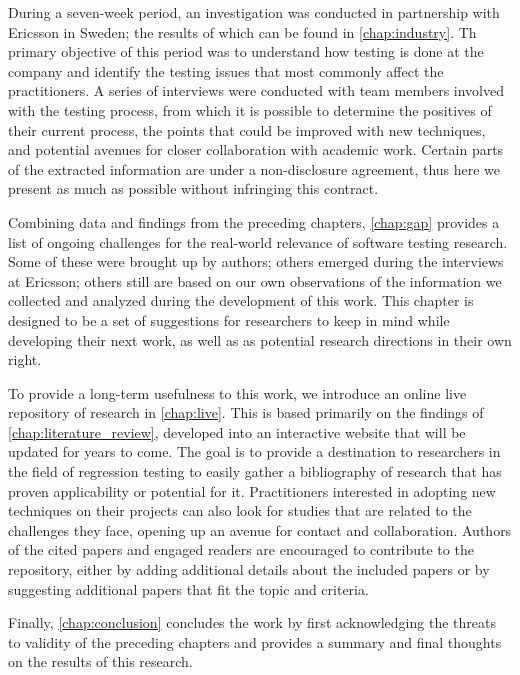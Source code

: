 During a seven-week period, an investigation was conducted in partnership with Ericsson in Sweden; the results of which can be found in \autoref{chap:industry}.
Th primary objective of this period was to understand how testing is done at the company and identify the testing issues that most commonly affect the practitioners.
A series of interviews were conducted with team members involved with the testing process, from which it is possible to determine the positives of their current process, the points that could be improved with new techniques, and potential avenues for closer collaboration with academic work.
Certain parts of the extracted information are under a non-disclosure agreement, thus here we present as much as possible without infringing this contract.

Combining data and findings from the preceding chapters, \autoref{chap:gap} provides a list of ongoing challenges for the real-world relevance of software testing research.
Some of these were brought up by authors; others emerged during the interviews at Ericsson; others still are based on our own observations of the information we collected and analyzed during the development of this work.
This chapter is designed to be a set of suggestions for researchers to keep in mind while developing their next work, as well as as potential research directions in their own right.

To provide a long-term usefulness to this work, we introduce an online live repository of research in \autoref{chap:live}.
This is based primarily on the findings of \autoref{chap:literature_review}, developed into an interactive website that will be updated for years to come.
The goal is to provide a destination to researchers in the field of regression testing to easily gather a bibliography of research that has proven applicability or potential for it.
Practitioners interested in adopting new techniques on their projects can also look for studies that are related to the challenges they face, opening up an avenue for contact and collaboration.
Authors of the cited papers and engaged readers are encouraged to contribute to the repository, either by adding additional details about the included papers or by suggesting additional papers that fit the topic and criteria.

Finally, \autoref{chap:conclusion} concludes the work by first acknowledging the threats to validity of the preceding chapters and provides a summary and final thoughts on the results of this research.

